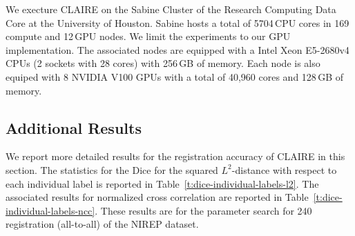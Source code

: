 \documentclass[11pt]{amsart}
\newcommand{\tabref}[1]{Table~\ref{#1}}
\begin{document}
We execture CLAIRE on the Sabine Cluster of the Research Computing Data Core at the University of Houston. Sabine hosts a total of 5704\,CPU cores in 169\,compute and 12\,GPU nodes. We limit the experiments to our GPU implementation. The associated nodes are equipped with a Intel Xeon E5-2680v4 CPUs (2 sockets with 28 cores) with 256\,GB of memory. Each node is also equiped with 8 NVIDIA V100 GPUs with a total of 40,960 cores and 128\,GB of memory.




\subsection*{Additional Results}

We report more detailed results for the registration accuracy of CLAIRE in this section. The statistics for the Dice for the squared $L^2$-distance with respect to each individual label is reported in \tabref{t:dice-individual-labels-l2}. The associated results for normalized cross correlation are reported in \tabref{t:dice-individual-labels-ncc}. These results are for the parameter search for 240 registration (all-to-all) of the NIREP dataset.
\end{document}
